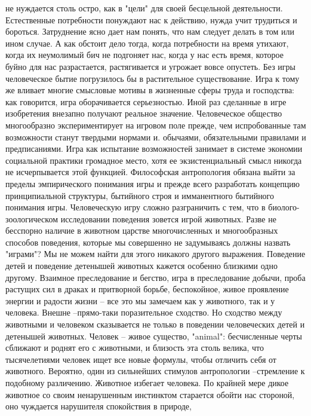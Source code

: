 \documentclass[12pt]{article}
\begin{document}
не  нуждается  столь  остро,  как  в  "цели"  для  своей  бесцельной  деятельности.  Естественные  потребности
понуждают нас к действию, нужда учит трудиться и бороться. Затруднение ясно дает нам понять, что нам
следует делать в том или ином случае. А как обстоит дело тогда, когда потребности на время утихают, когда их
неумолимый бич не подгоняет нас, когда у нас есть время, которое буйно для нас разрастается, растягивается и
угрожает вовсе опустеть. Без игры человеческое бытие погрузилось бы в растительное существование. Игра к
тому  же  вливает  многие  смысловые  мотивы  в  жизненные  сферы  труда  и  господства:  как  говорится,  игра
оборачивается серьезностью. Иной раз сделанные в игре изобретения внезапно получают реальное значение.
Человеческое общество  многообразно экспериментирует  на  игровом поле  прежде,  чем  испробованные там
возможности станут твердыми нормами и. обычаями, обязательными правилами и предписаниями. Игра как
испытание  возможностей  занимает  в  системе  экономии  социальной  практики  громадное  место,  хотя  ее
экзистенциальный смысл никогда не исчерпывается этой функцией. Философская антропология обязана выйти
за пределы эмпирического понимания игры и прежде всего разработать концепцию принципиальной структуры,
бытийного строя и имманентного бытийного понимания игры.
Человеческую игру сложно разграничить с тем, что в
биолого-зоологическом  исследовании  поведения  зовется  игрой  животных.  Разве  не  бесспорно  наличие  в
животном  царстве  многочисленных  и  многообразных  способов  поведения,  которые  мы  совершенно  не
задумываясь должны назвать "играми"? Мы не можем найти для этого никакого другого выражения. Поведение
детей и поведение детенышей животных кажется особенно близкими одно другому. Взаимное преследование и
бегство, игра в преследование добычи, проба растущих сил в драках и притворной борьбе, беспокойное, живое
проявление энергии и радости жизни -- все это мы замечаем как у животного, так и у человека. Внешне --прямо-таки  поразительное  сходство.  Но  сходство  между  животными  и  человеком  сказывается  не  только  в
поведении человеческих детей и детенышей животных. Человек -- живое существо, "animal": бесчисленные
черты сближают и роднят его с животными, и близость эта столь велика, что тысячелетиями человек ищет все
новые формулы, чтобы отличить себя от животного. Вероятно, один из сильнейших стимулов антропологии --стремление к подобному различению. Животное избегает человека. По крайней мере дикое животное со своим
ненарушенным инстинктом старается обойти нас стороной, оно чуждается нарушителя спокойствия в природе,
\end{document}
